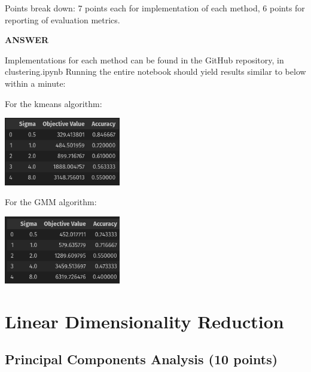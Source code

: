 \documentclass[a4paper]{article}
\newcounter{thm}
\theoremstyle{definition}
\begin{document}
Points break down: 7 points each for implementation of each method, 6 points for reporting of
evaluation metrics.

\textbf{ANSWER}

Implementations for each method can be found in the GitHub repository, in clustering.ipynb
Running the entire notebook should yield results similar to below within a minute:

For the kmeans algorithm:

\includegraphics[width=2in]{hw5/1_2_kmeans.png} \hspace{0.4in}

For the GMM algorithm:

\includegraphics[width=2in]{hw5/1_2_gmm.png} \hspace{0.4in}



\section{Linear Dimensionality Reduction}

\subsection{Principal Components Analysis  (10 points)}
\label{sec:pca}
\end{document}
